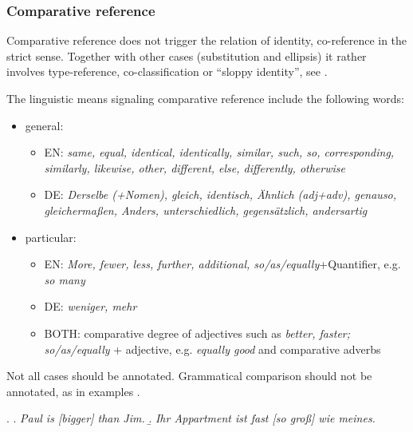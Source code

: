 \documentclass[a4paper]{article}
\begin{document}


\subsubsection{Comparative reference}\label{comp}

Comparative reference does not trigger the relation of identity, co-reference in the strict sense. Together with other cases (substitution and ellipsis) it rather involves type-reference, co-classification or ``sloppy identity'', see \cite{KunzSteiner2012}.

The linguistic means signaling comparative reference include the following words: 

\begin{itemize}
\item general: 
\begin{itemize}
\item EN: {\sl same, equal, identical, identically, similar, such, so, corresponding, similarly, likewise, other, different, else,
differently, otherwise}
\item DE: {\sl Derselbe (+Nomen), gleich, identisch, Ähnlich (adj+adv), genauso, gleichermaßen, Anders, unterschiedlich, gegensätzlich, andersartig}
\end{itemize}
\item particular:

\begin{itemize}
\item EN: {\sl More, fewer, less, further, additional, so/as/equally}+Quantifier, e.g. {\sl so many}
\item DE: {\sl weniger, mehr}
\item BOTH: comparative degree of adjectives such as {\sl better, faster; so/as/equally} + 
adjective, e.g. {\sl equally good} and comparative adverbs
\end{itemize}
\end{itemize}

Not all cases should be annotated. %
Grammatical comparison should not be annotated, as in examples \Next[a-b].

\ex.
\a. {\sl Paul is [bigger] than Jim.}
\b. {\sl Ihr Appartment ist fast [so groß] wie meines.}
\end{document}
